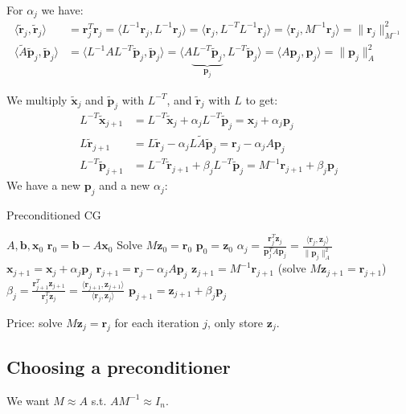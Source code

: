 For $\alpha_j$ we have:
\begin{align*}
    \langle \tilde{\mathbf{r}}_j, \tilde{\mathbf{r}}_j \rangle & = \mathbf{r}_j^T \mathbf{r}_j = \langle L^{-1} \mathbf{r}_j, L^{-1} \mathbf{r}_j \rangle = \langle \mathbf{r}_j, L^{-T} L^{-1} \mathbf{r}_j \rangle = \langle \mathbf{r}_j, M^{-1} \mathbf{r}_j \rangle = \|\mathbf{r}_j\|_{M^{-1}}^2 \\
    \langle \tilde{A} \tilde{\mathbf{p}}_j, \tilde{\mathbf{p}}_j \rangle & = \langle L^{-1} A L^{-T} \tilde{\mathbf{p}}_j, \tilde{\mathbf{p}}_j \rangle = \langle A \underbrace{L^{-T} \tilde{\mathbf{p}}_j}_{\mathbf{p}_j}, L^{-T} \tilde{\mathbf{p}}_j \rangle = \langle A \mathbf{p}_j, \mathbf{p}_j \rangle = \|\mathbf{p}_j\|_A^2
\end{align*}

We multiply $\tilde{\mathbf{x}}_j$ and $\tilde{\mathbf{p}}_j$ with $L^{-T}$, and $\tilde{\mathbf{r}}_j$ with $L$ to get:
\begin{align*}
    L^{-T} \tilde{\mathbf{x}}_{j+1} & = L^{-T} \tilde{\mathbf{x}}_j + \alpha_j L^{-T} \tilde{\mathbf{p}}_j = \mathbf{x}_j + \alpha_j \mathbf{p}_j \\
    L \tilde{\mathbf{r}}_{j+1} & = L \tilde{\mathbf{r}}_j - \alpha_j L \tilde{A} \tilde{\mathbf{p}}_j = \mathbf{r}_j - \alpha_j A \mathbf{p}_j \\
    L^{-T} \tilde{\mathbf{p}}_{j+1} & = L^{-T} \tilde{\mathbf{r}}_{j+1} + \beta_j L^{-T} \tilde{\mathbf{p}}_j = M^{-1} \mathbf{r}_{j+1} + \beta_j \mathbf{p}_j
\end{align*}
We have a new $\mathbf{p}_j$ and a new $\alpha_j$:
\begin{algorithm}[H]
    \caption{Preconditioned CG}
    \begin{algorithmic}
        \Require
        \State $A, \mathbf{b}, \mathbf{x}_0$
        \State $\mathbf{r}_0 = \mathbf{b} - A \mathbf{x}_0$
        \State Solve $M \mathbf{z}_0 = \mathbf{r}_0$
        \State $\mathbf{p}_0 = \mathbf{z}_0$
        \State $\alpha_j = \frac{\mathbf{r}_j^T \mathbf{z}_j}{\mathbf{p}_j^T A \mathbf{p}_j} = \frac{\langle \mathbf{r}_j, \mathbf{z}_j \rangle}{\|\mathbf{p}_j\|_A^2}$
        \State $\mathbf{x}_{j+1} = \mathbf{x}_j + \alpha_j \mathbf{p}_j$
        \State $\mathbf{r}_{j+1} = \mathbf{r}_j - \alpha_j A \mathbf{p}_j$
        \State $\mathbf{z}_{j+1} = M^{-1} \mathbf{r}_{j+1}$ (solve $M \mathbf{z}_{j+1} = \mathbf{r}_{j+1}$)
        \State $\beta_j = \frac{\mathbf{r}_{j+1}^T \mathbf{z}_{j+1}}{\mathbf{r}_j^T \mathbf{z}_j} = \frac{\langle \mathbf{r}_{j+1}, \mathbf{z}_{j+1} \rangle}{\langle \mathbf{r}_j, \mathbf{z}_j \rangle}$
        \State $\mathbf{p}_{j+1} = \mathbf{z}_{j+1} + \beta_j \mathbf{p}_j$
        \EndFor
    \end{algorithmic}
\end{algorithm}

Price: solve $M \mathbf{z}_j = \mathbf{r}_j$ for each iteration $j$, only store $\mathbf{z}_j$.

\subsection{Choosing a preconditioner}
We want $M \approx A$ s.t. $A M^{-1} \approx I_n$.
